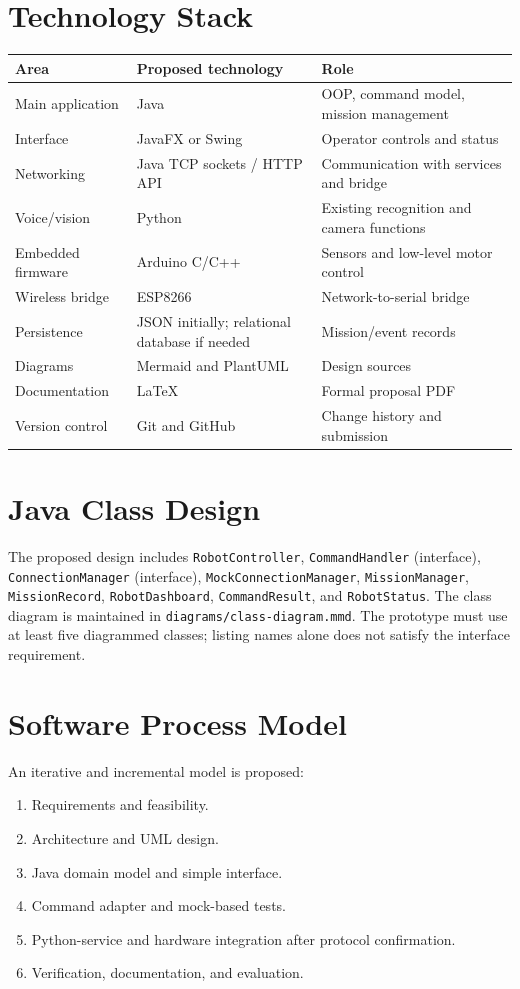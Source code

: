 \documentclass[12pt,a4paper]{article}
\begin{document}
\section{Technology Stack}
\begin{longtable}{p{3cm}p{4cm}p{5.2cm}}\toprule
Area & Proposed technology & Role\\\midrule
Main application & Java & OOP, command model, mission management\\
Interface & JavaFX or Swing & Operator controls and status\\
Networking & Java TCP sockets / HTTP API & Communication with services and bridge\\
Voice/vision & Python & Existing recognition and camera functions\\
Embedded firmware & Arduino C/C++ & Sensors and low-level motor control\\
Wireless bridge & ESP8266 & Network-to-serial bridge\\
Persistence & JSON initially; relational database if needed & Mission/event records\\
Diagrams & Mermaid and PlantUML & Design sources\\
Documentation & LaTeX & Formal proposal PDF\\
Version control & Git and GitHub & Change history and submission\\\bottomrule
\end{longtable}

\section{Java Class Design}
The proposed design includes \texttt{RobotController}, \texttt{CommandHandler} (interface), \texttt{ConnectionManager} (interface), \texttt{MockConnectionManager}, \texttt{MissionManager}, \texttt{MissionRecord}, \texttt{RobotDashboard}, \texttt{CommandResult}, and \texttt{RobotStatus}. The class diagram is maintained in \texttt{diagrams/class-diagram.mmd}. The prototype must use at least five diagrammed classes; listing names alone does not satisfy the interface requirement.

\section{Software Process Model}
An iterative and incremental model is proposed:
\begin{enumerate}
\item Requirements and feasibility.
\item Architecture and UML design.
\item Java domain model and simple interface.
\item Command adapter and mock-based tests.
\item Python-service and hardware integration after protocol confirmation.
\item Verification, documentation, and evaluation.
\end{enumerate}
\end{document}
